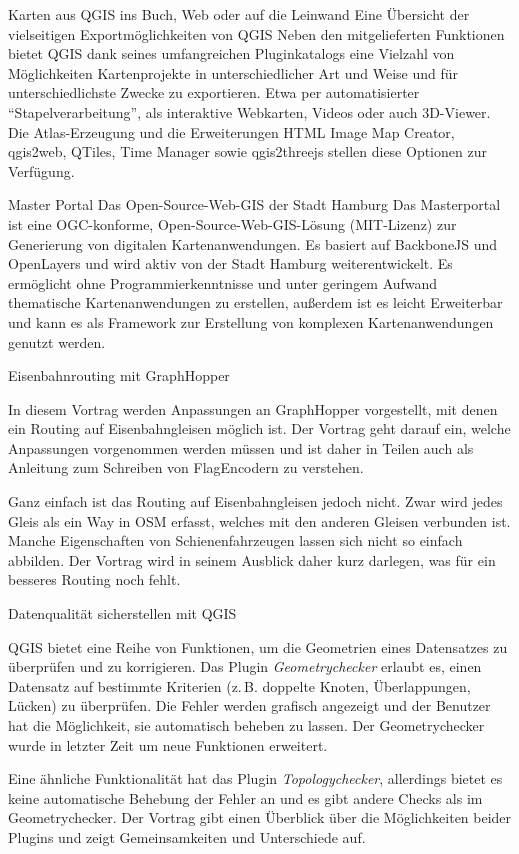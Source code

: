 

%
{Karten aus QGIS ins Buch, Web oder auf die Leinwand}%
{Eine Übersicht der vielseitigen Exportmöglichkeiten von QGIS}%
{%
Neben den mitgelieferten Funktionen bietet QGIS dank seines umfangreichen Pluginkatalogs eine
Vielzahl von Möglichkeiten Kartenprojekte in unterschiedlicher Art und Weise und für
unterschiedlichste Zwecke zu exportieren. Etwa per automatisierter "`Stapelverarbeitung"', als
interaktive Webkarten, Videos oder auch 3D-Viewer. Die Atlas-Erzeugung und die Erweiterungen HTML Image
Map Creator, qgis2web, QTiles, Time Manager sowie qgis2threejs stellen diese Optionen zur Verfügung.%
}

%
{Master Portal}%
{Das Open-Source-Web-GIS der Stadt Hamburg}%
{%
  Das Masterportal ist eine OGC-konforme, Open-Source-Web-GIS-Lösung (MIT-Lizenz) zur Generierung von digitalen
Kartenanwendungen. Es basiert auf BackboneJS und OpenLayers und wird aktiv von der Stadt Hamburg
weiterentwickelt. Es ermöglicht ohne Programmierkenntnisse und unter geringem Aufwand thematische
Kartenanwendungen zu erstellen, außerdem ist es leicht Erweiterbar und kann es als Framework zur
Erstellung von komplexen Kartenanwendungen genutzt werden.%
}

%
{Eisenbahnrouting mit GraphHopper}%
{}%
{%
In diesem Vortrag werden Anpassungen an GraphHopper vorgestellt, mit denen ein Routing auf
Eisenbahngleisen möglich ist. Der Vortrag geht darauf ein, welche Anpassungen vorgenommen werden
müssen und ist daher in Teilen auch als Anleitung zum Schreiben von FlagEncodern zu verstehen.

Ganz einfach ist das Routing auf Eisenbahngleisen jedoch nicht. Zwar wird jedes Gleis als ein Way in
OSM erfasst, welches mit den anderen Gleisen verbunden ist. Manche Eigenschaften von
Schienenfahrzeugen lassen sich nicht so einfach abbilden. Der Vortrag wird in seinem Ausblick daher
kurz darlegen, was für ein besseres Routing noch fehlt.%
}


%
{Datenqualität sicherstellen mit QGIS}%
{}%
{%
QGIS bietet eine Reihe von Funktionen, um die Geometrien eines Datensatzes zu
überprüfen und zu korrigieren. Das Plugin \emph{Geometrychecker} erlaubt es, einen
Datensatz auf bestimmte Kriterien (z.\,B. doppelte Knoten, Überlappungen,
Lücken) zu überprüfen. Die Fehler werden grafisch angezeigt und der
Benutzer hat die Möglichkeit, sie automatisch beheben zu lassen. Der
Geometrychecker wurde in letzter Zeit um neue Funktionen erweitert.

Eine ähnliche Funktionalität hat das Plugin \emph{Topologychecker},
allerdings bietet es keine automatische Behebung der Fehler an und es gibt
andere Checks als im Geometrychecker. Der Vortrag gibt einen Überblick über
die Möglichkeiten beider Plugins und zeigt Gemeinsamkeiten und Unterschiede
auf.
}

